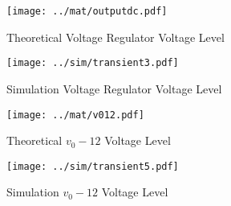 \begin{figure}[H]
      \texttt{[image: ../mat/outputdc.pdf]}
      \caption{Theoretical Voltage Regulator Voltage Level}
    \endminipage\hfill
      \texttt{[image: ../sim/transient3.pdf]}
      \caption{Simulation Voltage Regulator Voltage Level}
    \endminipage\hfill
\end{figure}

\begin{figure}[H]
      \texttt{[image: ../mat/v012.pdf]}
      \caption{Theoretical $v_0-12$ Voltage Level}
    \endminipage\hfill
      \texttt{[image: ../sim/transient5.pdf]}
      \caption{Simulation $v_0-12$ Voltage Level}
    \endminipage\hfill
\end{figure}

